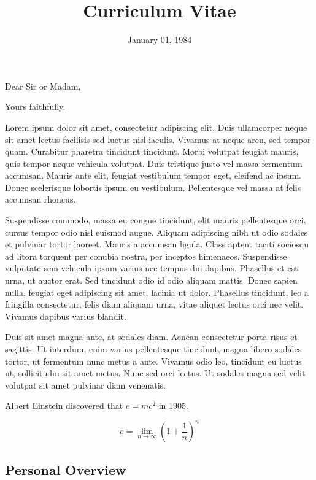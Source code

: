 \documentclass[11pt,letterpaper,sans]{moderncv} %
\title{Curriculum Vitae}
\begin{document}
\date{January 01, 1984}
\opening{Dear Sir or Madam,}
\closing{Yours faithfully,}
\makelettertitle
Lorem ipsum dolor sit amet, consectetur adipiscing elit. Duis ullamcorper neque sit amet lectus facilisis sed luctus nisl iaculis. Vivamus at neque arcu, sed tempor quam. Curabitur pharetra tincidunt tincidunt. Morbi volutpat feugiat mauris, quis tempor neque vehicula volutpat. Duis tristique justo vel massa fermentum accumsan. Mauris ante elit, feugiat vestibulum tempor eget, eleifend ac ipsum. Donec scelerisque lobortis ipsum eu vestibulum. Pellentesque vel massa at felis accumsan rhoncus.

Suspendisse commodo, massa eu congue tincidunt, elit mauris pellentesque orci, cursus tempor odio nisl euismod augue. Aliquam adipiscing nibh ut odio sodales et pulvinar tortor laoreet. Mauris a accumsan ligula. Class aptent taciti sociosqu ad litora torquent per conubia nostra, per inceptos himenaeos. Suspendisse vulputate sem vehicula ipsum varius nec tempus dui dapibus. Phasellus et est urna, ut auctor erat. Sed tincidunt odio id odio aliquam mattis. Donec sapien nulla, feugiat eget adipiscing sit amet, lacinia ut dolor. Phasellus tincidunt, leo a fringilla consectetur, felis diam aliquam urna, vitae aliquet lectus orci nec velit. Vivamus dapibus varius blandit.

Duis sit amet magna ante, at sodales diam. Aenean consectetur porta risus et sagittis. Ut interdum, enim varius pellentesque tincidunt, magna libero sodales tortor, ut fermentum nunc metus a ante. Vivamus odio leo, tincidunt eu luctus ut, sollicitudin sit amet metus. Nunc sed orci lectus. Ut sodales magna sed velit volutpat sit amet pulvinar diam venenatis.

Albert Einstein discovered that $e=mc^2$ in 1905.

\[ e=\lim_{n \to \infty} \left(1+\frac{1}{n}\right)^n \]

\makeletterclosing



\makecvtitle{}
\subsection{Personal Overview}
\end{document}
